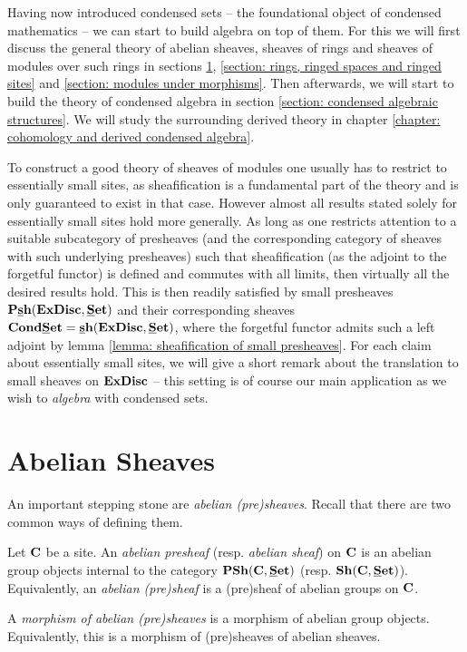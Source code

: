 
Having now introduced condensed sets -- the foundational object of condensed mathematics -- we can start to build algebra on top of them. For this we will first discuss the general theory of abelian sheaves, sheaves of rings and sheaves of modules over such rings in sections \ref{section: abelian sheaves}, \ref{section: rings, ringed spaces and ringed sites} and \ref{section: modules under morphisms}. Then afterwards, we will start to build the theory of condensed algebra in section \ref{section: condensed algebraic structures}. We will study the surrounding derived theory in chapter \ref{chapter: cohomology and derived condensed algebra}.

To construct a good theory of sheaves of modules one usually has to restrict to essentially small sites, as sheafification is a fundamental part of the theory and is only guaranteed to exist in that case. However almost all results stated solely for essentially small sites hold more generally. As long as one restricts attention to a suitable subcategory of presheaves (and the corresponding category of sheaves with such underlying presheaves) such that sheafification (as the adjoint to the forgetful functor) is defined and commutes with all limits, then virtually all the desired results hold. This is then readily satisfied by small presheaves $\smallPresheaves{\extremallyDisconnectedSets}{\Set}$ and their corresponding sheaves $\condensedSets = \smallSheaves{\extremallyDisconnectedSets}{\Set}$, where the forgetful functor admits such a left adjoint by lemma \ref{lemma: sheafification of small presheaves}. For each claim about essentially small sites, we will give a short remark about the translation to small sheaves on ${\mathbf{ExDisc}}$ -- this setting is of course our main application as we wish to \emph{algebra} with condensed sets.

\section{Abelian Sheaves}
\label{section: abelian sheaves}

An important stepping stone are \emph{abelian (pre)sheaves}. Recall that there are two common ways of defining them.
\begin{definition}
	Let ${{\mathbf{C}}}$ be a site. An \emph{abelian presheaf} (resp. \emph{abelian sheaf}) on ${{\mathbf{C}}}$ is an abelian group objects internal to the category $\Presheaves{\site{C}}{\Set}$ (resp. $\Sheaves{\site{C}}{\Set}$). Equivalently, an \emph{abelian (pre)sheaf} is a (pre)sheaf of abelian groups on ${{\mathbf{C}}}$.
	
	A \emph{morphism of abelian (pre)sheaves} is a morphism of abelian group objects. Equivalently, this is a morphism of (pre)sheaves of abelian sheaves.
\end{definition}

